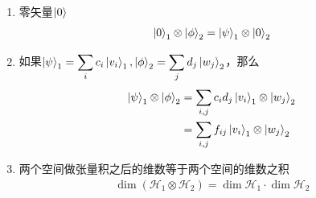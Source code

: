\documentclass{article}
\begin{document}
\begin{enumerate}
	      假设对于一个算符存在两个纠缠态$\ket{v_1}_1,\ket{v_2}_1\in V_1$,
	      以及$\ket{w_1}_2,\ket{w_2}_2\in V_2$
	      \begin{enumerate}
		      \item 如果粒子1的态矢量可以写为
		            \begin{align*}
			            \ket{\psi}_1=a\ket{v_1}_1+b\ket{v_2}_1
		            \end{align*}
		            如果粒子2的态矢量可以写为
		            \begin{align*}
			            \ket{\phi}_2=c\ket{w_1}_2+d\ket{w_2}_2
		            \end{align*}
		            那么这两个粒子所组成的态矢量$(\ket{\psi}_1\otimes\ket{\phi}_2)$，是非纠缠态的
		      \item 双粒子态为纠缠态的粒子
		            \begin{itemize}
			            \item
			                  \begin{align*}
				                  \ket{\psi}_{1\otimes 2}=a\ket{v_1}_1\otimes c\ket{w_1}_2+b\ket{v_2}_1\otimes d\ket{w_2}_2
			                  \end{align*}
			            \item
			                  \begin{align*}
				                  \ket{\psi}_{1\otimes 2}=a\ket{v_1}_1\otimes d\ket{w_2}_2 +b\ket{v_2}_1\otimes c\ket{w_1}_2
			                  \end{align*}
		            \end{itemize}
	      \end{enumerate}
	\item 零矢量$\ket{0}$
	      \begin{align*}
		      \ket{0}_1\otimes\ket{\phi}_2=\ket{\psi}_1\otimes\ket{0}_2
	      \end{align*}
	\item 如果$\displaystyle\ket{\psi}_1=\sum_{i}c_i\ket{v_i}_1,\ket{\phi}_2=\sum_{j}d_j\ket{w_j}_2$，那么
	      \begin{align*}
		      \ket{\psi}_1\otimes\ket{\phi}_2 & =\sum_{i,j}c_id_j\ket{v_i}_1\otimes\ket{w_j}_2  \\
		                                      & = \sum_{i,j}f_{ij}\ket{v_i}_1\otimes\ket{w_j}_2
	      \end{align*}
	\item 两个空间做张量积之后的维数等于两个空间的维数之积
	      \begin{align*}
		      \dim{}(\mathcal{H}_1\otimes\mathcal{H}_2)=\dim{\mathcal{H}_1}\cdot\dim{\mathcal{H}_2}

\end{align*}
\end{enumerate}
\end{document}

